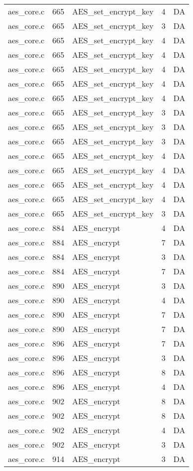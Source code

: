 \begin{table}
\begin{tabular}{lrlrr}
aes\_core.c& 665&AES\_set\_encrypt\_key&4 &DA\\
aes\_core.c& 665&AES\_set\_encrypt\_key&3 &DA\\
aes\_core.c& 665&AES\_set\_encrypt\_key&4 &DA\\
aes\_core.c& 665&AES\_set\_encrypt\_key&4 &DA\\
aes\_core.c& 665&AES\_set\_encrypt\_key&4 &DA\\
aes\_core.c& 665&AES\_set\_encrypt\_key&4 &DA\\
aes\_core.c& 665&AES\_set\_encrypt\_key&4 &DA\\
aes\_core.c& 665&AES\_set\_encrypt\_key&3 &DA\\
aes\_core.c& 665&AES\_set\_encrypt\_key&3 &DA\\
aes\_core.c& 665&AES\_set\_encrypt\_key&3 &DA\\
aes\_core.c& 665&AES\_set\_encrypt\_key&4 &DA\\
aes\_core.c& 665&AES\_set\_encrypt\_key&4 &DA\\
aes\_core.c& 665&AES\_set\_encrypt\_key&4 &DA\\
aes\_core.c& 665&AES\_set\_encrypt\_key&4 &DA\\
aes\_core.c& 665&AES\_set\_encrypt\_key&3 &DA\\
aes\_core.c& 884&AES\_encrypt&4 &DA\\
aes\_core.c& 884&AES\_encrypt&7 &DA\\
aes\_core.c& 884&AES\_encrypt&3 &DA\\
aes\_core.c& 884&AES\_encrypt&7 &DA\\
aes\_core.c& 890&AES\_encrypt&3 &DA\\
aes\_core.c& 890&AES\_encrypt&4 &DA\\
aes\_core.c& 890&AES\_encrypt&7 &DA\\
aes\_core.c& 890&AES\_encrypt&7 &DA\\
aes\_core.c& 896&AES\_encrypt&7 &DA\\
aes\_core.c& 896&AES\_encrypt&3 &DA\\
aes\_core.c& 896&AES\_encrypt&8 &DA\\
aes\_core.c& 896&AES\_encrypt&4 &DA\\
aes\_core.c& 902&AES\_encrypt&8 &DA\\
aes\_core.c& 902&AES\_encrypt&8 &DA\\
aes\_core.c& 902&AES\_encrypt&4 &DA\\
aes\_core.c& 902&AES\_encrypt&3 &DA\\
aes\_core.c& 914&AES\_encrypt&3 &DA\\

\end{tabular}
\end{table}

